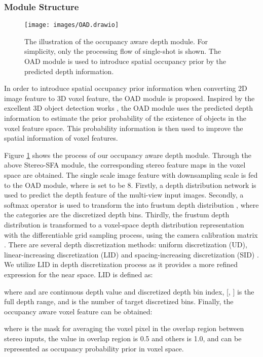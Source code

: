 \documentclass{article}
\begin{document}
	\subsubsection{Module Structure}
	\begin{figure}[!t]
            \flushright
		\texttt{[image: images/OAD.drawio]}
		\caption{The illustration of the occupancy aware depth module. For simplicity, only the processing flow of single-shot  is shown. The OAD module is used to introduce spatial occupancy prior by the predicted depth information.}
		\label{sectionOccupancyAwareDepth}
	\end{figure}
	In order to introduce spatial occupancy prior information when converting 2D image feature to 3D voxel feature, the OAD module is proposed.
	Inspired by the excellent 3D object detection works \cite{li2022unifying,reading2021categorical}, the OAD module uses the predicted depth information to estimate the prior probability of the existence of objects in the voxel feature space. This probability information is then used to improve the spatial information of voxel features.
	
	Figure \ref{sectionOccupancyAwareDepth} shows the process of our occupancy aware depth module.
	Through the above Stereo-SFA module, the corresponding stereo feature maps in the voxel space  are obtained.
	The single scale image feature  with downsampling scale  is fed to the OAD module, where  is set to be 8.
	Firstly, a depth distribution network  is used to predict the depth feature  of the multi-view input images.
	Secondly, a softmax operator is used to transform the  into frustum depth distribution , where the categories are the  discretized depth bins.
	Thirdly, the frustum depth distribution  is transformed to a voxel-space depth distribution representation  with the differentiable grid sampling process, using the camera calibration matrix .
There are several depth discretization methods: uniform discretization (UD), linear-increasing discretization (LID) \cite{tang2021center3d} and spacing-increasing discretization (SID) \cite{fu2018deep}.
	We utilize LID in depth discretization process as it provides a more refined expression for the near space. LID is defined as:
	
	where  and  are continuous depth value and discretized depth bin index, [, ] is the full depth range, and  is the number of target discretized bins.
	Finally, the occupancy aware voxel feature  can be obtained:
	
	where  is the mask for averaging the voxel pixel in the overlap region between stereo inputs, the value in overlap region is 0.5 and others is 1.0, and  can be represented as occupancy probability prior in voxel space.
	
\end{document}
